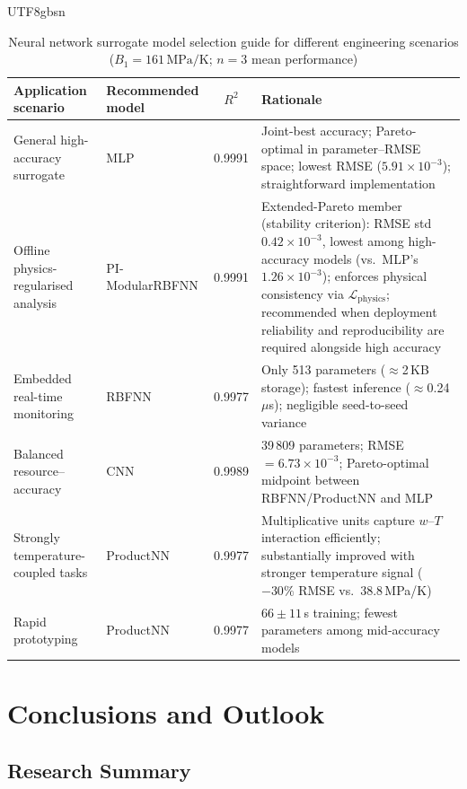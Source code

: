 \documentclass[a4paper,12pt]{report}
\newcommand{\Lphys}{\mathcal{L}_{\text{physics}}}
\begin{document}
\begin{CJK}{UTF8}{gbsn}
\begin{table}[H]
  \centering
  \caption{Neural network surrogate model selection guide for different engineering scenarios
    ($B_1 = 161\,\mathrm{MPa/K}$; $n=3$ mean performance)}
  \label{tab:selection}
  \begin{tabularx}{\textwidth}{llcX}
    \toprule
    \textbf{Application scenario} & \textbf{Recommended model} & \textbf{$R^2$} & \textbf{Rationale} \\
    \midrule
    General high-accuracy surrogate & MLP & 0.9991 &
      Joint-best accuracy; Pareto-optimal in parameter--RMSE space; lowest RMSE
      ($5.91\times10^{-3}$); straightforward implementation \\
    Offline physics-regularised analysis & PI-ModularRBFNN & 0.9991 &
      Extended-Pareto member (stability criterion): RMSE std $0.42\times10^{-3}$, lowest
      among high-accuracy models (vs.\ MLP's $1.26\times10^{-3}$); enforces physical
      consistency via $\Lphys$; recommended when deployment reliability and
      reproducibility are required alongside high accuracy \\
    Embedded real-time monitoring & RBFNN & 0.9977 &
      Only 513 parameters ($\approx$2\,KB storage); fastest inference
      ($\approx$0.24\,$\mu$s); negligible seed-to-seed variance \\
    Balanced resource--accuracy & CNN & 0.9989 &
      39\,809 parameters; RMSE $= 6.73\times10^{-3}$; Pareto-optimal midpoint
      between RBFNN/ProductNN and MLP \\
    Strongly temperature-coupled tasks & ProductNN & 0.9977 &
      Multiplicative units capture $w$--$T$ interaction efficiently;
      substantially improved with stronger temperature signal ($-30\%$ RMSE vs.\ 38.8\,MPa/K) \\
    Rapid prototyping & ProductNN & 0.9977 &
      $66\pm11$\,s training; fewest parameters among mid-accuracy models \\
    \bottomrule
  \end{tabularx}
\end{table}

\chapter{Conclusions and Outlook}
\label{chap:conclusions}

\section{Research Summary}
\label{sec:summary}


\end{CJK}
\end{document}
